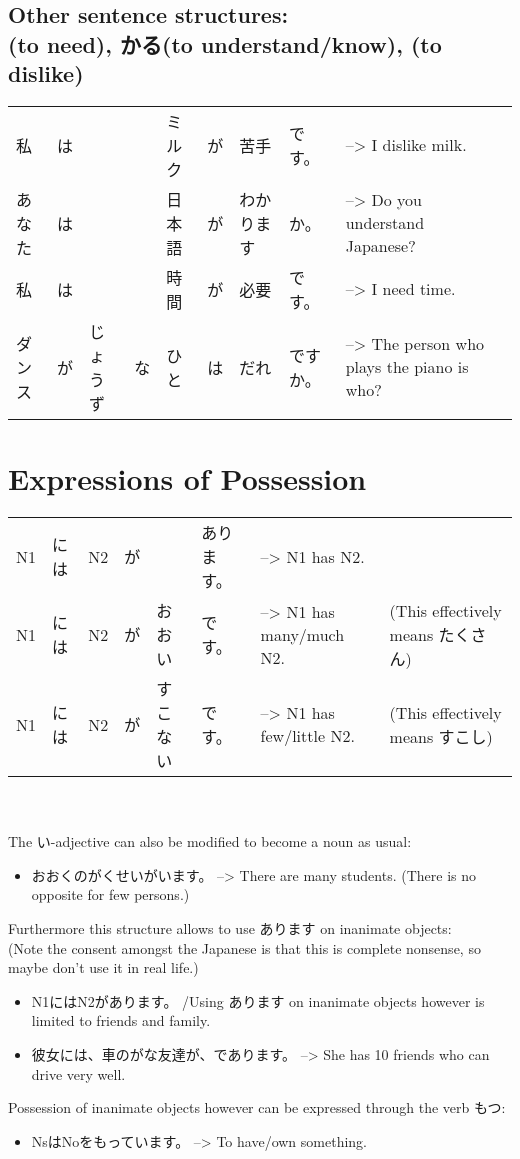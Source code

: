 \documentclass{article}
\newcommand\tab[1][1cm]{\hspace*{#1}}
\begin{document}
\subsection{Other sentence structures: \\  (to need), かる(to understand/know), (to dislike) }
\vspace{1mm}
\tab \begin{tabular}{ l l l l l l l l l l }
私&は&&&ミルク&が&苦手&です。& --> I dislike milk.\\
あなた&は&&&日本語&が&わかります&か。& --> Do you understand Japanese?\\
私&は&&&時間&が&必要&です。& --> I need time.\\
ダンス&が&じょうず&な&ひと&は&だれ&ですか。& --> The person who plays the piano is who?\\
\end{tabular}
\section{Expressions of Possession}
\vspace{1mm}
\tab \begin{tabular}{ l l l l l l l l }
N1&には&N2&が&&あります。& --> N1 has N2. & \\
N1&には&N2&が&おおい&です。& --> N1 has many/much N2. & (This effectively means たくさん) \\
N1&には&N2&が&すこない&です。& --> N1 has few/little N2. & (This effectively means すこし) \\
\end{tabular}
\vspace{2mm} \\ \\
The い-adjective can also be modified to become a noun as usual:
\begin{itemize}
\item おおくのがくせいがいます。 --> There are many students. (There is no opposite for few persons.) \\
\end{itemize}
Furthermore this structure allows to use あります on inanimate objects: \\ 
(Note the consent amongst the Japanese is that this is complete nonsense, so maybe don't use it in real life.)
\begin{itemize}
\item N1にはN2があります。 /Using あります on inanimate objects however is limited to friends and family.
\item 彼女には、車のがな友達が、であります。 --> She has 10 friends who can drive very well.
\end{itemize}
\vspace{3mm}
Possession of inanimate objects however can be expressed through the verb もつ:
\begin{itemize}
\item NsはNoをもっています。 --> To have/own something.
\end{itemize}
\vspace{3mm}
\end{document}

